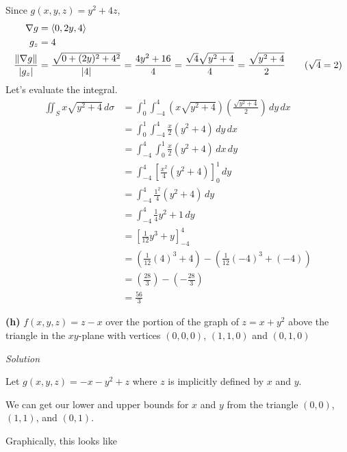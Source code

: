 \documentclass{article}
\newcommand{\lrp}[1]{\left( #1 \right)}
\newcommand{\lra}[1]{\left\langle #1 \right\rangle}
\newcommand{\lrb}[1]{\left[ #1 \right]}
\newcommand{\norm}[1]{\left\lVert #1 \right\rVert}
\newcommand{\Solution}{\textit{Solution}}
\begin{document}
Since $g(x,y,z)=y^2+4z$,
\begin{align*}
    \nabla g &=\lra{0,2y,4}\\
    g_z&=4\\
    \frac{\norm{\nabla g}}{\left|g_z\right|}&=\frac{\sqrt{0+(2y)^2+4^2}}{\left|4\right|}=\frac{4y^2+16}{4}=\frac{\sqrt{4}\sqrt{y^2+4}}{4}=\frac{\sqrt{y^2+4}}{2}\tag{$\sqrt{4}=2$}
\end{align*}
Let's evaluate the integral.
\begin{align*}
    \iint_{S}x\sqrt{y^2+4}\,d\sigma &=\int_0^1 \int_{-4}^4 \lrp{x\sqrt{y^2+4}}\lrp{\frac{\sqrt{y^2+4}}{2}}\,dy\,dx\\
    &=\int_0^1 \int_{-4}^4 \frac{x}{2}\lrp{y^2+4}\,dy\,dx\\
    &=\int_{-4}^4\int_0^1 \frac{x}{2}\lrp{y^2+4}\,dx\,dy\tag{the other order looked dreadful}\\
    &=\int_{-4}^4 \lrb{\frac{x^2}{4}(y^2+4)}_0^1\,dy\\
    &=\int_{-4}^4 \frac{1^2}{4}\lrp{y^2+4}\,dy\\
    &=\int_{-4}^4 \frac{1}{4}y^2+1\,dy\\
    &=\lrb{\frac{1}{12}y^3+y}_{-4}^4\\
    &=\lrp{\frac{1}{12}(4)^3+4}-\lrp{\frac{1}{12}(-4)^3+(-4)}\\
    &=\lrp{\frac{28}{3}}-\lrp{-\frac{28}{3}}\tag{use a calculator}\\
    &=\boxed{\frac{56}{3}}
\end{align*}

{}\textbf{(h)} $f(x,y,z)=z-x$ over the portion of the graph of $z=x+y^2$ above the triangle in the $xy$-plane with vertices $(0,0,0)$, $(1,1,0)$ and $(0,1,0)$

\Solution

Let $g(x,y,z)=-x-y^2+z$ where $z$ is implicitly defined by $x$ and $y$. 

We can get our lower and upper bounds for $x$ and $y$ from the triangle $(0,0)$, $(1,1)$, and $(0,1)$.


Graphically, this looks like
\begin{center}
\end{center}
\end{document}

